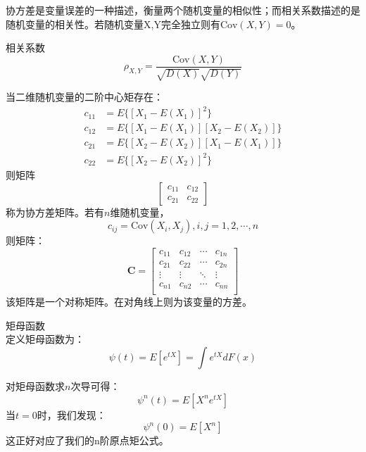 协方差是变量误差的一种描述，衡量两个随机变量的相似性；而相关系数描述的是随机变量的相关性。若随机变量X,Y完全独立则有$\mathrm{Cov}(X,Y)=0$。

\begin{definition}{相关系数}
    \begin{equation}
        \rho_{X,Y}=\frac{\mathrm{Cov}(X,Y)}{\sqrt{D(X)}\sqrt{D(Y)}}
    \end{equation}
\end{definition}

当二维随机变量的二阶中心矩存在：
\begin{equation}
    \begin{aligned}
        c_{11}&=E\{[ X_1-E(X_1) ]^2\}\\
        c_{12}&=E\{[ X_1-E(X_1) ][ X_2-E(X_2) ]\}\\
        c_{21}&=E\{[ X_2-E(X_2) ][ X_1-E(X_1) ]\}\\
        c_{22}&=E\{[ X_2-E(X_2) ]^2\}
    \end{aligned}
\end{equation}
则矩阵$$ \left[\begin{matrix}
    c_{11}&c_{12}\\
    c_{21}&c_{22}
\end{matrix}\right] $$
称为协方差矩阵。若有$n$维随机变量，
\begin{equation}
    c_{ij}=\mathrm{Cov}(X_i,X_j),i,j=1,2,\cdots,n
\end{equation}
则矩阵：
\begin{equation}
    \mathbf{C}=\left[
    \begin{matrix}
        c_{11} & c_{12} & \cdots & c_{1n}\\
        c_{21} & c_{22} & \cdots & c_{2n}\\
        \vdots & \vdots & \ddots & \vdots\\
        c_{n1} & c_{n2} & \cdots & c_{nn}\\
    \end{matrix}
    \right]
\end{equation}
该矩阵是一个对称矩阵。在对角线上则为该变量的方差。

\begin{definition}{矩母函数\\}
    定义矩母函数为：\begin{equation}
        \psi(t)=E[e^{tX}]=\int e^{tX}dF(x)
    \end{equation}
\end{definition}
对矩母函数求$n$次导可得：
\begin{equation}
    \psi^{n}(t) = E[X^n e^{tX}]
\end{equation}
当$t=0$时，我们发现：
\begin{equation}
    \psi ^n(0) = E[X^n]
\end{equation}
这正好对应了我们的n阶原点矩公式。
